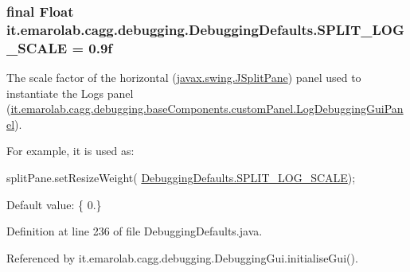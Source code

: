 \hypertarget{classit_1_1emarolab_1_1cagg_1_1debugging_1_1DebuggingDefaults_a03575ca73c5c42d6d8f6a4433ff9db73}{
\subsubsection[{S\-P\-L\-I\-T\-\_\-\-L\-O\-G\-\_\-\-S\-C\-A\-L\-E}]{\setlength{\rightskip}{0pt plus 5cm}final Float it.\-emarolab.\-cagg.\-debugging.\-Debugging\-Defaults.\-S\-P\-L\-I\-T\-\_\-\-L\-O\-G\-\_\-\-S\-C\-A\-L\-E = 0.\-9f\hspace{0.3cm}{\ttfamily [static]}}}\label{classit_1_1emarolab_1_1cagg_1_1debugging_1_1DebuggingDefaults_a03575ca73c5c42d6d8f6a4433ff9db73}
The scale factor of the horizontal (\hyperlink{}{javax.\-swing.\-J\-Split\-Pane}) panel used to instantiate the Logs panel (\hyperlink{classit_1_1emarolab_1_1cagg_1_1debugging_1_1baseComponents_1_1customPanel_1_1LogDebuggingGuiPanel}{it.\-emarolab.\-cagg.\-debugging.\-base\-Components.\-custom\-Panel.\-Log\-Debugging\-Gui\-Panel}).\par
 For example, it is used as\-:
\begin{DoxyCode}
splitPane.setResizeWeight( \hyperlink{classit_1_1emarolab_1_1cagg_1_1debugging_1_1DebuggingDefaults_a03575ca73c5c42d6d8f6a4433ff9db73}{DebuggingDefaults.SPLIT\_LOG\_SCALE}); 
\end{DoxyCode}
 \par
 Default value\-: \{ 0.\} 

Definition at line 236 of file Debugging\-Defaults.\-java.



Referenced by it.\-emarolab.\-cagg.\-debugging.\-Debugging\-Gui.\-initialise\-Gui().

